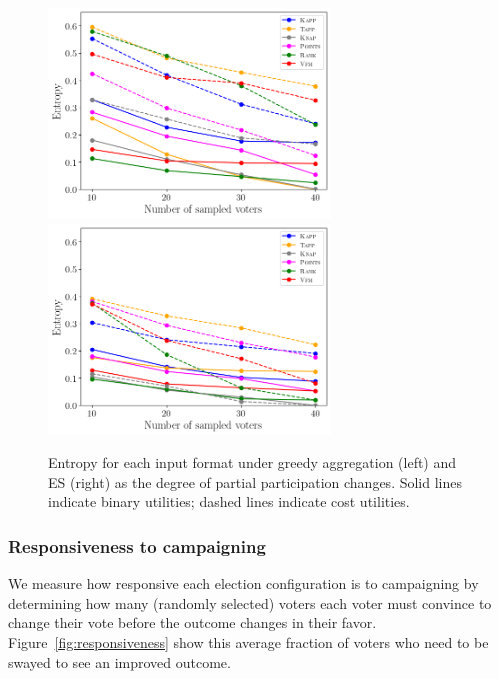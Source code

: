 \documentclass[mnsc,blindrev]{informs3_freeuse} %
\newcommand{\mes}{ES}
\begin{document}
\begin{figure}[!h]
\begin{center}
\includegraphics[width=7.5cm]{../experiment/entropy_greedy_large_b.png}
\includegraphics[width=7.5cm]{../experiment/entropy_es_large_b.png}
\caption{Entropy for each input format under  greedy aggregation  (left) and \mes{} (right)  as the degree of partial participation changes. Solid lines indicate binary utilities; dashed lines indicate cost utilities. 
}\label{fig:entropy}
\end{center}
\vspace{-3mm}
\end{figure}



\subsubsection{Responsiveness to campaigning}
We measure how responsive each election configuration is to campaigning by  determining how many (randomly selected) voters each voter must convince to change their vote before the outcome changes in their favor.
Figure~\ref{fig:responsiveness} show this average fraction of voters who need to be swayed to see an improved outcome. 
\end{document}
